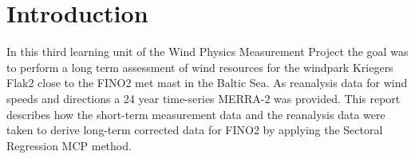 \documentclass[10pt]{article}
\begin{document}




\onehalfspacing

\tableofcontents
\newpage
\section*{Introduction}
In this third learning unit of the Wind Physics Measurement Project the goal was to perform a long term assessment of wind resources for the windpark Kriegers Flak2 close to the FINO2 met mast in the Baltic Sea. As reanalysis data for wind speeds and directions a 24 year time-series MERRA-2 was provided. This report describes how the short-term measurement data and the reanalysis data were taken to derive long-term corrected data for FINO2 by applying the Sectoral Regression MCP method.
 
\end{document}
